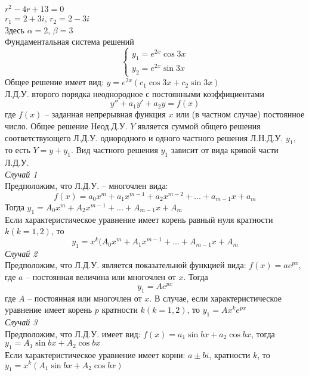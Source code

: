 \documentclass{article}
\numberwithin{equation}{section}
\begin{document}
$r^2-4r+13=0$\\
$r_1=2+3i$, $r_2=2-3i$\\
Здесь $\alpha=2$, $\beta=3$\\
Фундаментальная система решений
\begin{equation*}
\begin{cases}
y_1=e^{2x}\cos3x\\
y_2=e^{2x}\sin3x
\end{cases}
\end{equation*}
Общее решение имеет вид: $y=e^{2x}(c_1\cos3x+c_2\sin3x)$\\
Л.Д.У. второго порядка неоднородное с постоянными коэффициентами
\begin{equation}\label{e59}
y''+a_1y'+a_2y=f(x)
\end{equation}
где $f(x)$ -- заданная непрерывная функция $x$ или (в частном случае) постоянное число. Общее решение Неод.Д.У. $Y$ является суммой общего решения соответствующего Л.Д.У. однородного и одного частного решения Л.Н.Д.У. $y_1$, то есть $Y=y+y_1$. Вид частного решения $y_1$ зависит от вида кривой части Л.Д.У.\\
\textit{Случай 1}\\
Предположим, что Л.Д.У. -- многочлен вида:
\begin{equation}\label{e60}
f(x)=a_0x^m+a_1x^{m-1}+a_2x^{m-2}+...+a_{m-1}x+a_m
\end{equation}
Тогда $y_1=A_0x^m+A_2x^{m-1}+...+A_{m-1}x+A_m$\\
Если характеристическое уравнение имеет корень равный нуля кратности $k(k=1,2)$, то
\begin{equation}\label{e61}
y_1=x^k(A_0x^m+A_1x^{m-1}+...+A_{m-1}x+A_m
\end{equation}
\textit{Случай 2}\\
Предположим, что Л.Д.У. является показательной функцией вида: $f(x)=ae^{px}$, где $a$ -- постоянная величина или многочлен от $x$. Тогда
\begin{equation}\label{e62}
y_1=Ae^{px}
\end{equation}
где $A$ -- постоянная или многочлен от $x$. В случае, если характеристическое уравнение имеет корень $p$ кратности $k(k=1,2)$, то $y_1=Ax^ke^{px}$\\
\textit{Случай 3}\\
Предположим, что Л.Д.У. имеет вид: $f(x)=a_1\sin bx+a_2\cos bx$, тогда $y_1=A_1\sin bx+A_2\cos bx$\\
Если характеристическое уравнение имеет корни: $a\pm bi$, кратности $k$, то $y_1=x^k(A_1\sin bx+A_2\cos bx)$\\
\end{document}
